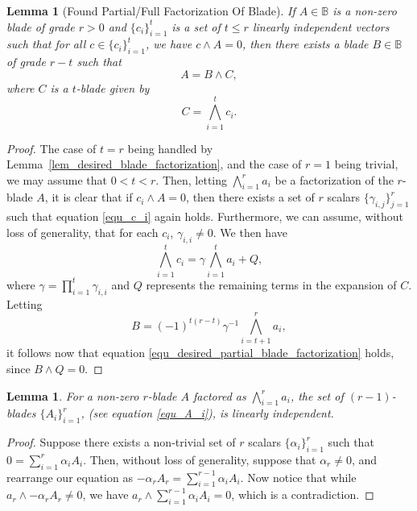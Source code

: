 \documentclass{birkjour}
\newtheorem{lem}[thm]{Lemma}
\theoremstyle{definition}
\theoremstyle{remark}
\numberwithin{equation}{section}
\newcommand{\B}{\mathbb{B}}
\begin{document}
\begin{lem}[Found Partial/Full Factorization Of Blade]\label{lem_desired_partial_blade_factorization}
If $A\in\B$ is a non-zero blade of grade $r>0$ and $\{c_i\}_{i=1}^t$ is a set of $t\leq r$ linearly
independent vectors such that for all $c\in\{c_i\}_{i=1}^t$, we have $c\wedge A=0$, then there
exists a blade $B\in\B$ of grade $r-t$ such that
\begin{equation}\label{equ_desired_partial_blade_factorization}
A=B\wedge C,
\end{equation}
where $C$ is a $t$-blade given by
\begin{equation}
C = \bigwedge_{i=1}^t c_i.
\end{equation}
\end{lem}
\begin{proof}
The case of $t=r$ being handled by Lemma~\ref{lem_desired_blade_factorization}, and the
case of $r=1$ being trivial, we may assume that $0<t<r$.  Then, letting $\bigwedge_{i=1}^r a_i$
be a factorization of the $r$-blade $A$, it is clear that if $c_i\wedge A=0$, then there exists a
set of $r$ scalars $\{\gamma_{i,j}\}_{j=1}^r$ such that equation \eqref{equ_c_i} again holds.
Furthermore, we can assume, without loss of generality, that for each $c_i$, $\gamma_{i,i}\neq 0$.
We then have
\begin{equation}
\bigwedge_{i=1}^t c_i = \gamma\bigwedge_{i=1}^t a_i + Q,
\end{equation}
where $\gamma=\prod_{i=1}^t\gamma_{i,i}$ and $Q$ represents the remaining terms in the
expansion of $C$.  Letting
\begin{equation}
B=(-1)^{t(r-t)}\gamma^{-1}\bigwedge_{i=t+1}^r a_i,
\end{equation}
it follows now that equation \eqref{equ_desired_partial_blade_factorization} holds, since $B\wedge Q=0$.
\end{proof}


\begin{lem}\label{lem_lin_indep_blades}
For a non-zero $r$-blade $A$ factored as $\bigwedge_{i=1}^r a_i$, the set of
$(r-1)$-blades $\{A_i\}_{i=1}^r$, (see equation \eqref{equ_A_i}), is linearly independent.
\end{lem}
\begin{proof}
Suppose there exists a non-trivial set of $r$ scalars $\{\alpha_i\}_{i=1}^r$
such that $0 = \sum_{i=1}^r\alpha_i A_i$.
Then, without loss of generality, suppose that $\alpha_r\neq 0$, and rearrange
our equation as $-\alpha_rA_r=\sum_{i=1}^{r-1}\alpha_iA_i$.  Now notice
that while $a_r\wedge-\alpha_rA_r\neq 0$, we have $a_r\wedge\sum_{i=1}^{r-1}\alpha_iA_i=0$,
which is a contradiction.
\end{proof}
\end{document}
